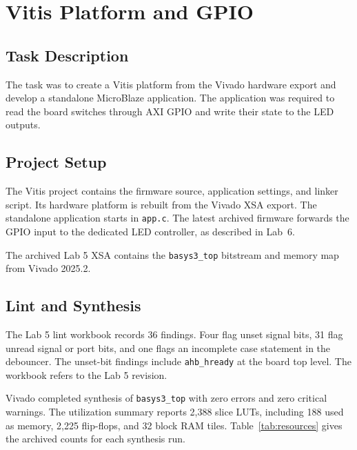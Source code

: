 \chapter{Vitis Platform and GPIO}

\section{Task Description}

The task was to create a Vitis platform from the Vivado hardware export and
develop a standalone MicroBlaze application. The application was required to
read the board switches through AXI GPIO and write their state to the LED
outputs.

\section{Project Setup}

The Vitis project contains the firmware source, application settings, and
linker script. Its hardware platform is rebuilt from the Vivado XSA export.
The standalone application starts in \texttt{app.c}. The latest archived
firmware forwards the GPIO input to the dedicated LED controller, as described
in Lab~6.

The archived Lab 5 XSA contains the \texttt{basys3\_top} bitstream and memory
map from Vivado 2025.2.

\section{Lint and Synthesis}

The Lab 5 lint workbook records 36 findings. Four flag unset signal bits,
31 flag unread signal or port bits, and one flags an incomplete case statement
in the debouncer. The unset-bit findings include \texttt{ahb\_hready} at the
board top level. The workbook refers to the Lab 5 revision.

Vivado completed synthesis of \texttt{basys3\_top} with zero errors and zero
critical warnings. The utilization summary reports 2,388 slice LUTs, including
188 used as memory, 2,225 flip-flops, and 32 block RAM tiles.
Table~\ref{tab:resources} gives the archived counts for each synthesis run.

